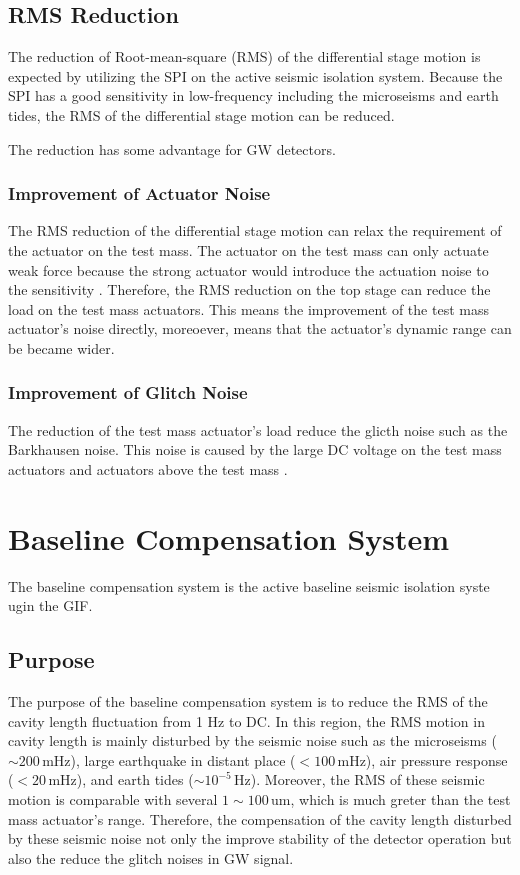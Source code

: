 \subsection{RMS Reduction}
The reduction of Root-mean-square (RMS) of the differential stage motion is expected by utilizing the SPI on the active seismic isolation system. Because the SPI has a good sensitivity in low-frequency including the microseisms and earth tides, the RMS of the differential stage motion can be reduced.

The reduction has some advantage for GW detectors.

\subsubsection{Improvement of Actuator Noise}
The RMS reduction of the differential stage motion can relax the requirement of the actuator on the test mass. The actuator on the test mass can only actuate weak force because the strong actuator would introduce the actuation noise to the sensitivity \cite{michimura2017mirror}. Therefore, the RMS reduction on the top stage can reduce the load on the test mass actuators. This means the improvement of the test mass actuator's noise directly, moreoever, means that the actuator's dynamic range can be became wider.

\subsubsection{Improvement of Glitch Noise}
The reduction of the test mass actuator's load reduce the glicth noise such as the Barkhausen noise. This noise is caused by the large DC voltage on the test mass actuators and actuators above the test mass \cite{aasi2015characterization}.




\section{Baseline Compensation System}\label{sec:52}
The baseline compensation system is the active baseline seismic isolation syste ugin the GIF. 

\subsection{Purpose}
The purpose of the baseline compensation system is to reduce the RMS of the cavity length fluctuation from 1 Hz to DC. In this region, the RMS motion in cavity length is mainly disturbed by the seismic noise such as the microseisms ($\sim 200\,\mathrm{mHz}$), large earthquake in distant place ($< 100\,\mathrm{mHz}$), air pressure response ($< 20\, \mathrm{mHz}$), and earth tides ($\sim 10^{-5}\,\mathrm{Hz}$). Moreover, the RMS of these seismic motion is comparable with several $1\sim100\,\mathrm{um}$, which is much greter than the test mass actuator's range. Therefore, the compensation of the cavity length disturbed by these seismic noise not only the improve stability of the detector operation but also the reduce the glitch noises in GW signal.

